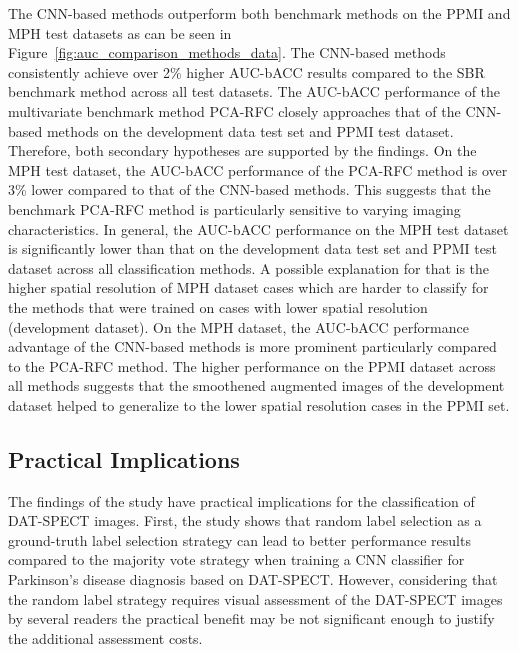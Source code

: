 The CNN-based methods outperform both benchmark methods on the PPMI and MPH test datasets 
as can be seen in Figure~\ref{fig:auc_comparison_methods_data}.
The CNN-based methods consistently achieve over 2\% higher AUC-bACC results compared to the SBR benchmark method
across all test datasets.
The AUC-bACC performance of the multivariate benchmark method PCA-RFC closely approaches that of the CNN-based methods 
on the development data test set and PPMI test dataset.
Therefore, both secondary hypotheses are supported by the findings.
On the MPH test dataset, the AUC-bACC performance of the PCA-RFC method is over 3\% lower
compared to that of the CNN-based methods.
This suggests that the benchmark PCA-RFC method is particularly sensitive to varying imaging characteristics.
In general, the AUC-bACC performance on the MPH test dataset is significantly lower 
than that on the development data test set and PPMI test dataset across all classification methods.
A possible explanation for that is the higher spatial resolution of MPH dataset cases
which are harder to classify for the methods that were trained on cases with lower spatial resolution (development dataset).
On the MPH dataset, the AUC-bACC performance advantage of the CNN-based methods is more prominent 
particularly compared to the PCA-RFC method.
The higher performance on the PPMI dataset across all methods suggests that the smoothened augmented images
of the development dataset helped to generalize to the lower spatial resolution cases in the PPMI set.


\subsection{Practical Implications}

The findings of the study have practical implications for the classification of DAT-SPECT images.
First, the study shows that random label selection as a ground-truth label selection strategy 
can lead to better performance results compared to the majority vote strategy 
when training a CNN classifier for Parkinson's disease diagnosis based on DAT-SPECT.
However, considering that the random label strategy requires visual assessment of the DAT-SPECT images by several readers 
the practical benefit may be not significant enough to justify the additional assessment costs.

